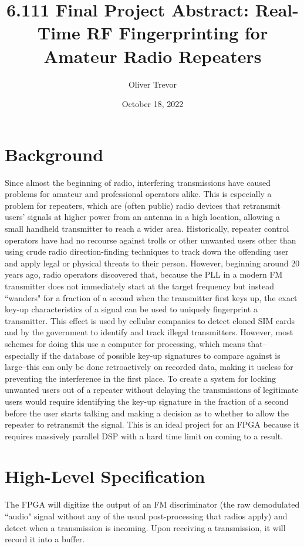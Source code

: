 \documentclass{article}
\title{6.111 Final Project Abstract: Real-Time RF Fingerprinting for Amateur Radio Repeaters}
\author{Oliver Trevor}
\date{October 18, 2022}
\begin{document}
\maketitle

\section{Background}

Since almost the beginning of radio, interfering transmissions have caused problems for amateur and professional operators alike. This is especially a problem for repeaters, which are (often public) radio devices that retransmit users' signals at higher power from an antenna in a high location, allowing a small handheld transmitter to reach a wider area. Historically, repeater control operators have had no recourse against trolls or other unwanted users other than using crude radio direction-finding techniques to track down the offending user and apply legal or physical threats to their person. However, beginning around 20 years ago, radio operators discovered that, because the PLL in a modern FM transmitter does not immediately start at the target frequency but instead ``wanders" for a fraction of a second when the transmitter first keys up, the exact key-up characteristics of a signal can be used to uniquely fingerprint a transmitter. This effect is used by cellular companies to detect cloned SIM cards and by the government to identify and track illegal transmitters. However, most schemes for doing this use a computer for processing, which means that--especially if the database of possible key-up signatures to compare against is large--this can only be done retroactively on recorded data, making it useless for preventing the interference in the first place. To create a system for locking unwanted users out of a repeater without delaying the transmissions of legitimate users would require identifying the key-up signature in the fraction of a second before the user starts talking and making a decision as to whether to allow the repeater to retransmit the signal. This is an ideal project for an FPGA because it requires massively parallel DSP with a hard time limit on coming to a result.

\section{High-Level Specification}

The FPGA will digitize the output of an FM discriminator (the raw demodulated ``audio" signal without any of the usual post-processing that radios apply) and detect when a transmission is incoming. Upon receiving a transmission, it will record it into a buffer.
\end{document}
